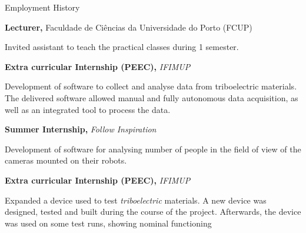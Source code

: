 \begin{rubric}{Employment History}

%
%
	\textbf{Lecturer,} Faculdade de Ciências da Universidade do Porto (FCUP)
	\par Invited assistant to teach the practical classes during 1 semester.
%

\entry*[\dates{2017-02/2017-08}]
	\textbf{Extra curricular Internship (PEEC),} \textit{IFIMUP}
	\par Development of software to collect and analyse data from triboelectric materials. The delivered software allowed manual and fully autonomous data acquisition, as well as an integrated tool to process the data.

\entry*[\dates{2017-07/2017-09}]
	\textbf{Summer Internship,} \textit{Follow Inspiration}
	\par Development of software for analysing number of people in the field of view of the cameras mounted on their robots.

\entry*[\dates{2016-02/2016-08}]
	\textbf{Extra curricular Internship (PEEC),} \textit{IFIMUP}
	\par Expanded a device used to test \textit{triboelectric} materials. A new device was designed, tested and built during the course of the project. Afterwards, the device was used on some test runs, showing nominal functioning
\end{rubric}






